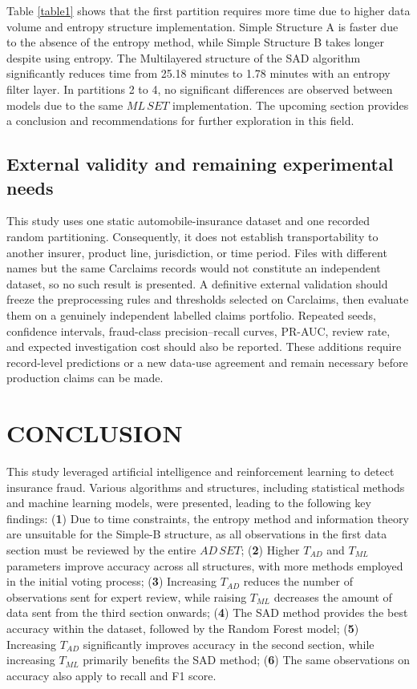 \documentclass[12pt]{article}
\begin{document}
Table \ref{table1} shows that the first partition requires more
time due to higher data volume and entropy structure
implementation. Simple Structure A is faster due to the absence of
the entropy method, while Simple Structure B takes longer despite
using entropy. The  Multilayered structure of the SAD algorithm significantly reduces time
from 25.18 minutes to 1.78 minutes with an entropy filter layer.
In partitions 2 to 4, no significant differences are observed
between models due to the same $ML\, SET$ implementation. The
upcoming section provides a conclusion and recommendations for
further exploration in this field.

\subsection*{External validity and remaining experimental needs}
This study uses one static automobile-insurance dataset and one recorded
random partitioning. Consequently, it does not establish transportability to
another insurer, product line, jurisdiction, or time period. Files with
different names but the same Carclaims records would not constitute an
independent dataset, so no such result is presented. A definitive external
validation should freeze the preprocessing rules and thresholds selected on
Carclaims, then evaluate them on a genuinely independent labelled claims
portfolio. Repeated seeds, confidence intervals, fraud-class precision--recall
curves, PR-AUC, review rate, and expected investigation cost should also be
reported. These additions require record-level predictions or a new data-use
agreement and remain necessary before production claims can be made.

\iffalse
\section{CONCLUSION}\label{SC:CONCLUSION}
This study leveraged artificial intelligence and reinforcement
learning to detect insurance fraud. Various algorithms and
structures, including statistical methods and machine learning
models, were presented, leading to the following key findings:
({\bf 1}) Due to time constraints, the entropy method and
information theory are unsuitable for the Simple-B structure, as
all observations in the first data section must be reviewed by the
entire $AD\, SET$; ({\bf 2}) Higher $T_{AD}$ and $T_{ML}$ parameters
improve accuracy across all structures, with more methods employed
in the initial voting process; ({\bf 3}) Increasing $T_{AD}$
reduces the number of observations sent for expert review, while
raising $T_{ML}$ decreases the amount of data sent from the third
section onwards; ({\bf 4}) The SAD method provides the best
accuracy within the dataset, followed by the Random Forest model;
({\bf 5}) Increasing $T_{AD}$ significantly improves accuracy in
the second section, while increasing $T_{ML}$ primarily benefits
the SAD method; ({\bf 6}) The same observations on accuracy also
apply to recall and F1 score.
\end{document}
